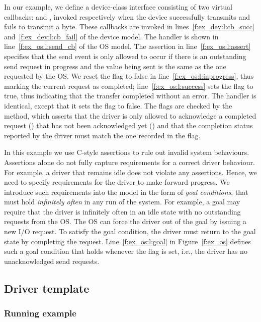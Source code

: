 In our example, we define a device-class interface consisting of two virtual callbacks:  and , invoked respectively when the device successfully transmits and fails to transmit a byte.  These callbacks are invoked in lines~\ref{f:ex_dev:l:cb_succ} and~\ref{f:ex_dev:l:cb_fail} of the device model.  The  handler is shown in line~\ref{f:ex_os:l:send_cb} of the OS model.  The assertion in line~\ref{f:ex_os:l:assert} specifies that the send event is only allowed to occur if there is an outstanding send request in progress and the value being sent is the same as the one requested by the OS\@.  We reset the  flag to false in line~\ref{f:ex_os:l:inprogress}, thus marking the current request as completed; line~\ref{f:ex_os:l:success} sets the  flag to true, thus indicating that the transfer completed without an error.  The  handler is identical, except that it sets the  flag to false.  The flags are checked by the  method, which asserts that the driver is only allowed to acknowledge a completed request () that has not been acknowledged yet () and that the completion status reported by the driver must match the one recorded in the  flag.

In this example we use C-style assertions to rule out invalid system behaviours.  Assertions alone do not fully capture requirements for a correct driver behaviour.  For example, a driver that remains idle does not violate any assertions.  Hence, we need to specify requirements for the driver to make forward progress.  We introduce such requirements into the model in the form of \emph{goal conditions}, that must hold \emph{infinitely often} in any run of the system.  For example, a goal may require that the driver is infinitely often in an idle state with no outstanding requests from the OS\@.  The OS can force the driver out of the goal by issuing a new I/O request.  To satisfy the goal condition, the driver must return to the goal state by completing the request.  Line~\ref{f:ex_os:l:goal} in Figure~\ref{f:ex_os} defines such a goal condition that holds whenever the  flag is set, i.e., the driver has no unacknowledged send requests.

\subsection{Driver template}

\subsubsection{Running example}

